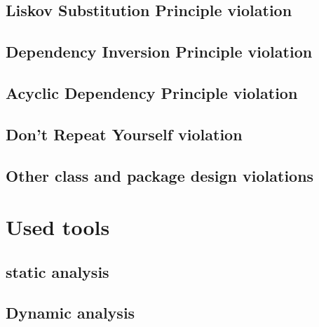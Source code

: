 \documentclass[a4paper, 10pt]{article}
\begin{document}
\subsection{Liskov Substitution Principle violation}
\label{sec:lsp_violation} %



\subsection{Dependency Inversion Principle violation}
\label{sec:dip_violation}


\subsection{Acyclic Dependency Principle violation}
\label{sec:adp_violation}


\subsection{Don't Repeat Yourself violation}
\label{sec:dry_violation}


\subsection{Other class and package design violations}
\label{sec:other_violations}

\newpage
\section{Used tools}
\label{sec:used_tools}


\subsection{static analysis}
\label{sec:static_analysis}


\subsection{Dynamic analysis}
\label{sec:dynamic_analysis}
\end{document}
